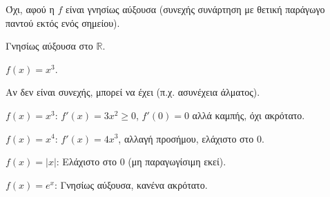 \documentclass[11pt,a4paper,modern]{FFExercises}
\begin{document}
\askhsh
\begin{alist}
    \item Όχι, αφού η $f$ είναι γνησίως αύξουσα (συνεχής συνάρτηση με θετική παράγωγο παντού εκτός ενός σημείου).
    \item Γνησίως αύξουσα στο $\mathbb{R}$.
    \item $f(x) = x^3$.
    \item Αν δεν είναι συνεχής, μπορεί να έχει (π.χ. ασυνέχεια άλματος).
\end{alist}

\askhsh
\begin{alist}
    \item $f(x) = x^3$: $f'(x) = 3x^2 \ge 0$, $f'(0) = 0$ αλλά καμπής, όχι ακρότατο.
    \item $f(x) = x^4$: $f'(x) = 4x^3$, αλλαγή προσήμου, ελάχιστο στο $0$.
    \item $f(x) = |x|$: Ελάχιστο στο $0$ (μη παραγωγίσιμη εκεί).
    \item $f(x) = e^x$: Γνησίως αύξουσα, κανένα ακρότατο.
\end{alist}
\end{document}
